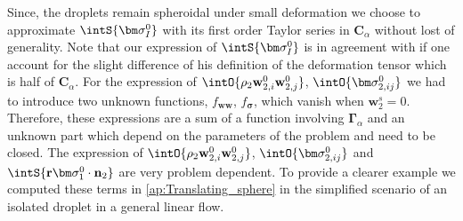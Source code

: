 Since, the droplets remain spheroidal under small deformation we choose to approximate $\intS{\bm\sigma_I^0}$ with its first order Taylor series in $\textbf{C}_\alpha$ without lost of generality.
Note that our expression of $\intS{\bm\sigma_I^0}$ is in agreement with \citet{lhuillier1987phenomenology} if one account for the slight difference of his definition of the deformation tensor which is half of $\textbf{C}_{\alpha}$. 
For the expression of $\intO{\rho_2 \textbf{w}_{2,i}^0\textbf{w}_{2,j}^0}$, $ \intO{\bm\sigma_{2,ij}^0}$ we had to introduce two unknown functions, $f_\textbf{ww}$, $f_{\bm{\sigma}}$, which vanish when $\textbf{w}^s_2 =0$. 
Therefore, these expressions are a sum of a function involving $\bm\Gamma_\alpha$ and an unknown part which depend on the parameters of the problem and need to be closed. 
The expression of $\intO{\rho_2 \textbf{w}_{2,i}^0\textbf{w}_{2,j}^0}$, $ \intO{\bm\sigma_{2,ij}^0}$ and $\intS{\textbf{r}\bm\sigma_1^0\cdot \textbf{n}_2}$ are very problem dependent. 
To provide a clearer example we computed these terms in \ref{ap:Translating_sphere} in the simplified scenario of an isolated droplet in a general linear flow. 



